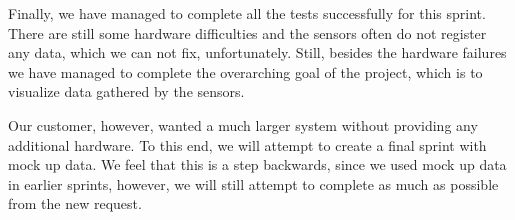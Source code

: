 \documentclass[../document]{subfiles}
\begin{document}
Finally, we have managed to complete all the tests successfully for this sprint. There are still some hardware difficulties and the sensors often do not register any data, which we can not fix, unfortunately. Still, besides the hardware failures we have managed to complete the overarching goal of the project, which is to visualize data gathered by the sensors. 

Our customer, however, wanted a much larger system without providing any additional hardware. To this end, we will attempt to create a final sprint with mock up data. We feel that this is a step backwards, since we used mock up data in earlier sprints, however, we will still attempt to complete as much as possible from the new request.
\end{document}
